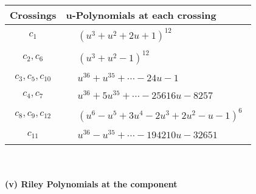 \documentclass[1p]{elsarticle_modified}
\theoremstyle{definition}
\begin{document}
\begin{tabular}{m{50pt}|m{274pt}}
Crossings & \hspace{64pt}u-Polynomials at each crossing \\
\hline $$\begin{aligned}c_{1}\end{aligned}$$&$\begin{aligned}
&(u^3+u^2+2 u+1)^{12}
\end{aligned}$\\
\hline $$\begin{aligned}c_{2},c_{6}\end{aligned}$$&$\begin{aligned}
&(u^3+u^2-1)^{12}
\end{aligned}$\\
\hline $$\begin{aligned}c_{3},c_{5},c_{10}\end{aligned}$$&$\begin{aligned}
&u^{36}+u^{35}+\cdots-24 u-1
\end{aligned}$\\
\hline $$\begin{aligned}c_{4},c_{7}\end{aligned}$$&$\begin{aligned}
&u^{36}+5 u^{35}+\cdots-25616 u-8257
\end{aligned}$\\
\hline $$\begin{aligned}c_{8},c_{9},c_{12}\end{aligned}$$&$\begin{aligned}
&(u^6- u^5+3 u^4-2 u^3+2 u^2- u-1)^6
\end{aligned}$\\
\hline $$\begin{aligned}c_{11}\end{aligned}$$&$\begin{aligned}
&u^{36}- u^{35}+\cdots-194210 u-32651
\end{aligned}$\\
\hline
\end{tabular}\\~\\
\newpage\renewcommand{\arraystretch}{1}
\flushleft \textbf{(v) Riley Polynomials at the component}\newline \\
\end{document}
